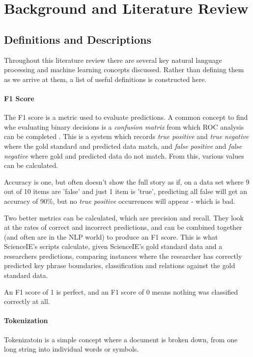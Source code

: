 \chapter{Background and Literature Review}

\section{Definitions and Descriptions}
Throughout this literature review there are several key natural language processing and machine learning concepts discussed. Rather than defining them as we arrive at them, a list of useful definitions is constructed here.

\subsubsection*{F1 Score}
The F1 score is a metric used to evaluate predictions. A common concept to find whe evaluating binary decisions is a \textit{confusion matrix} from which ROC analysis can be completed \cite{Fawcett2006}. This is a system which records \textit{true positive} and \textit{true negative} where the gold standard and predicted data match, and \textit{false positive} and \textit{false negative} where gold and predicted data do not match. From this, various values can be calculated. 

Accuracy is one, but often doesn't show the full story as if, on a data set where 9 out of 10 items are 'false' and just 1 item is 'true', predicting all false will get an accuracy of 90\%, but no \textit{true positive} occurrences will appear - which is bad. 

Two better metrics can be calculated, which are precision and recall. They look at the rates of correct and incorrect predictions, and can be combined together (and often are in the NLP world) to produce an F1 score. This is what ScienceIE's scripts calculate, given ScienceIE's gold standard data and a researchers predictions, comparing instances where the researcher has correctly predicted key phrase boundaries, classification and relations against the gold standard data.

An F1 score of 1 is perfect, and an F1 score of 0 means nothing was classified correctly at all.

\subsubsection*{Tokenization}
Tokenizatoin is a simple concept where a document is broken down, from one long string into individual words or symbols. 

